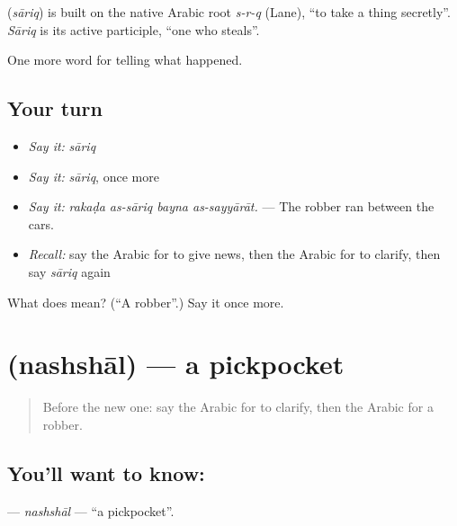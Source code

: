 \begin{cousinweb}
\textbf{} (\emph{sāriq}) is built on the native Arabic root \emph{s-r-q} (Lane), \textquotedblleft{}to take a thing secretly\textquotedblright{}. \emph{Sāriq} is its active participle, \textquotedblleft{}one who steals\textquotedblright{}.
\end{cousinweb}

\begin{grammarlens}[title={What you've built}]
One more word for telling what happened.
\end{grammarlens}

\subsection*{Your turn}
\begin{itemize}
\raggedright
  \item \emph{Say it:} \emph{sāriq}
  \item \emph{Say it:} \emph{sāriq}, once more
  \item \emph{Say it:} \emph{rakaḍa as-sāriq bayna as-sayyārāt.} — The robber ran between the cars.
  \item \emph{Recall:} say the Arabic for to give news, then the Arabic for to clarify, then say \emph{sāriq} again
\end{itemize}

\begin{tcolorbox}[breakable,colback=teal!4,colframe=teal!35!black,title={Before you move on}]
What does  mean? (\textquotedblleft{}A robber\textquotedblright{}.) Say it once more.
\end{tcolorbox}
\section[\texorpdfstring{\ar{نشال} (nashshāl)}{نشال (nashshāl)}]{ (nashshāl) — a pickpocket}

\label{lesson:AR-C321-nashshal}



\begin{quote}
Before the new one: say the Arabic for to clarify, then the Arabic for a robber.
\end{quote}

\subsection*{You'll want to know: }
\textbf{} — \emph{nashshāl} — \textquotedblleft{}a pickpocket\textquotedblright{}.

